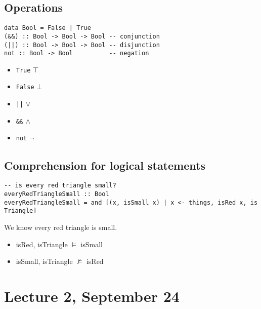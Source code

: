 \documentclass{article}
\begin{document}
\subsection{Operations}
\begin{verbatim}
data Bool = False | True
(&&) :: Bool -> Bool -> Bool -- conjunction
(||) :: Bool -> Bool -> Bool -- disjunction
not :: Bool -> Bool          -- negation
\end{verbatim}
\begin{itemize}
	\item \texttt{True} $\top$
	\item \texttt{False} $\bot$
	\item \texttt{||} $\vee$
	\item \texttt{\&\&} $\wedge$
	\item \texttt{not} $\neg$
\end{itemize}
\subsection{Comprehension for logical statements}
\begin{verbatim}
-- is every red triangle small?
everyRedTriangleSmall :: Bool
everyRedTriangleSmall = and [(x, isSmall x) | x <- things, isRed x, is Triangle]
\end{verbatim}
We know every red triangle is small.
\begin{itemize}
	\item isRed, isTriangle $\vDash$ isSmall
	\item isSmall, isTriangle $\not\vDash$ isRed
\end{itemize}
\section{Lecture 2, September 24}
\end{document}
